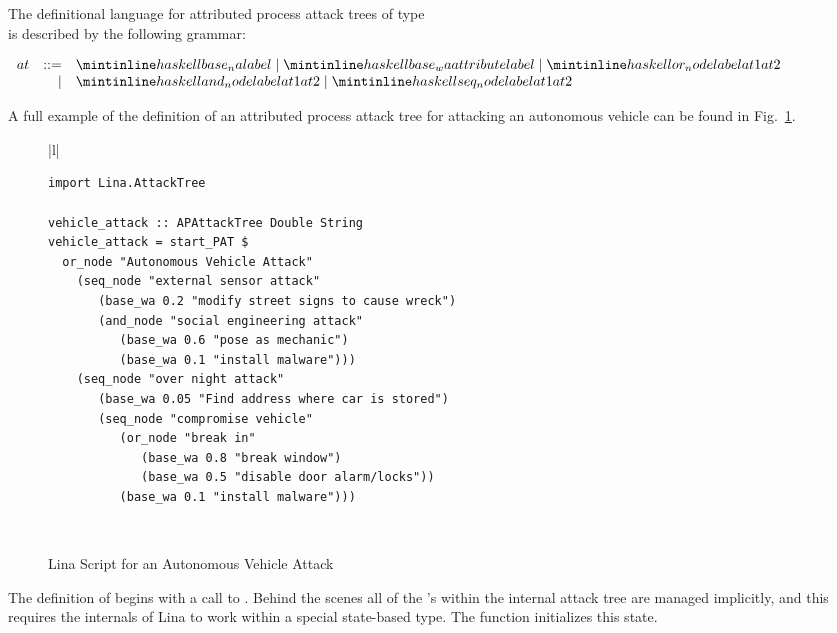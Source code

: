 The definitional language for attributed process attack trees of type \\
 is described by the following
grammar:
\begin{center}
  \footnotesize
  \begin{math}
    \begin{array}{lrlll}
      at & ::=  & \mh{base_na label} \mid \mh{base_wa attribute label} \mid \mh{or_node label at1 at2} \\
      & \mid & \mh{and_node label at1 at2} \mid \mh{seq_node label at1 at2}\\
    \end{array}
  \end{math}
\end{center}
A full example of the definition of an attributed process attack tree
for attacking an autonomous vehicle can be found in
Fig.~\ref{fig:vehicle_attack}. 
\begin{figure}
      \begin{tabular}{|l|}
        \hline\\[-7px]
      \begin{minipage}{\textwidth}
        \begin{verbatim}
import Lina.AttackTree

vehicle_attack :: APAttackTree Double String
vehicle_attack = start_PAT $
  or_node "Autonomous Vehicle Attack"
    (seq_node "external sensor attack"
       (base_wa 0.2 "modify street signs to cause wreck")
       (and_node "social engineering attack"
          (base_wa 0.6 "pose as mechanic")
          (base_wa 0.1 "install malware")))
    (seq_node "over night attack"
       (base_wa 0.05 "Find address where car is stored")
       (seq_node "compromise vehicle"
          (or_node "break in"
             (base_wa 0.8 "break window")
             (base_wa 0.5 "disable door alarm/locks"))
          (base_wa 0.1 "install malware")))
        \end{verbatim}
        \vspace{2px}
      \end{minipage} \\
      \hline
    \end{tabular}
  \caption{Lina Script for an Autonomous Vehicle Attack}
  \label{fig:vehicle_attack}
\end{figure}
The definition of  begins with a call to
.  Behind the scenes all of the 's within the
internal attack tree are managed implicitly, and this requires the
internals of Lina to work within a special state-based type.  The
function  initializes this state.

